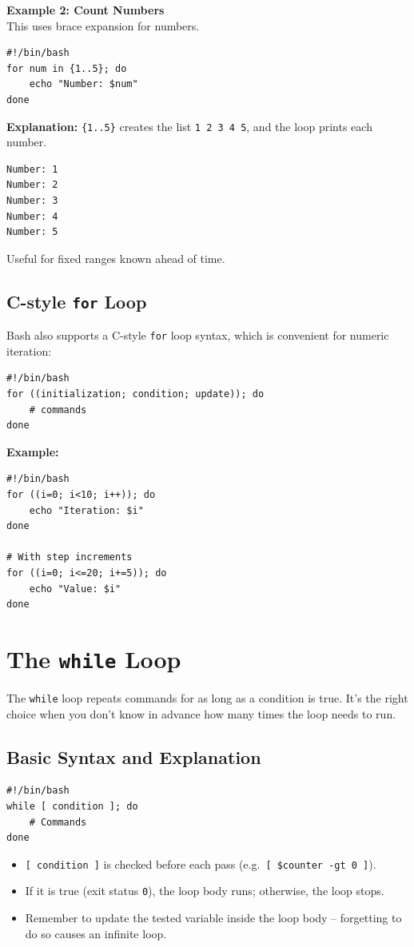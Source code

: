 \textbf{Example 2: Count Numbers}\\
This uses brace expansion for numbers.
\begin{lstlisting}[language=Terminal]
#!/bin/bash
for num in {1..5}; do
    echo "Number: $num"
done
\end{lstlisting}
\textbf{Explanation:} \texttt{\{1..5\}} creates the list \texttt{1 2 3 4 5}, and the loop prints each number.
\begin{lstlisting}[language=Terminal]
Number: 1
Number: 2
Number: 3
Number: 4
Number: 5
\end{lstlisting}
Useful for fixed ranges known ahead of time.

\subsection{C-style \texttt{for} Loop}
Bash also supports a C-style \texttt{for} loop syntax, which is convenient for numeric iteration:
\begin{lstlisting}[language=Terminal]
#!/bin/bash
for ((initialization; condition; update)); do
    # commands
done
\end{lstlisting}

\textbf{Example:}
\begin{lstlisting}[language=Terminal]
#!/bin/bash
for ((i=0; i<10; i++)); do
    echo "Iteration: $i"
done

# With step increments
for ((i=0; i<=20; i+=5)); do
    echo "Value: $i"
done
\end{lstlisting}

\section{The \texttt{while} Loop}
The \texttt{while} loop repeats commands for as long as a condition is true. It's the right choice when you don't know in advance how many times the loop needs to run.

\subsection{Basic Syntax and Explanation}
\begin{lstlisting}[language=Terminal]
#!/bin/bash
while [ condition ]; do
    # Commands
done
\end{lstlisting}
\begin{itemize}
    \item \texttt{[ condition ]} is checked before each pass (e.g.\ \texttt{[ \$counter -gt 0 ]}).
    \item If it is true (exit status \texttt{0}), the loop body runs; otherwise, the loop stops.
    \item Remember to update the tested variable inside the loop body -- forgetting to do so causes an infinite loop.
\end{itemize}

